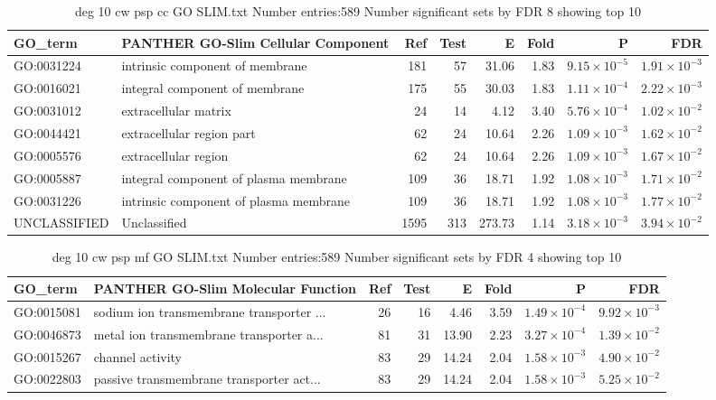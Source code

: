 \begin{table}[ht]
\centering
\begin{tabular}{llrrrrrr}
  \hline
GO\_term & PANTHER GO-Slim Cellular Component & Ref & Test & E & Fold & P & FDR \\ 
  \hline
GO:0031224 & intrinsic component of membrane  & 181 & 57 & 31.06 & 1.83 & $9.15 \times 10^{-5}$ & $1.91 \times 10^{-3}$ \\ 
  GO:0016021 & integral component of membrane  & 175 & 55 & 30.03 & 1.83 & $1.11 \times 10^{-4}$ & $2.22 \times 10^{-3}$ \\ 
  GO:0031012 & extracellular matrix  & 24 & 14 & 4.12 & 3.40 & $5.76 \times 10^{-4}$ & $1.02 \times 10^{-2}$ \\ 
  GO:0044421 & extracellular region part  & 62 & 24 & 10.64 & 2.26 & $1.09 \times 10^{-3}$ & $1.62 \times 10^{-2}$ \\ 
  GO:0005576 & extracellular region  & 62 & 24 & 10.64 & 2.26 & $1.09 \times 10^{-3}$ & $1.67 \times 10^{-2}$ \\ 
  GO:0005887 & integral component of plasma membrane  & 109 & 36 & 18.71 & 1.92 & $1.08 \times 10^{-3}$ & $1.71 \times 10^{-2}$ \\ 
  GO:0031226 & intrinsic component of plasma membrane  & 109 & 36 & 18.71 & 1.92 & $1.08 \times 10^{-3}$ & $1.77 \times 10^{-2}$ \\ 
  UNCLASSIFIED & Unclassified  & 1595 & 313 & 273.73 & 1.14 & $3.18 \times 10^{-3}$ & $3.94 \times 10^{-2}$ \\ 
  \hline
\end{tabular}
\caption{deg 10 cw psp cc GO SLIM.txt Number entries:589 Number significant sets by FDR 8 showing top 10} 
\label{tab:deg 10 cw psp cc GO SLIM.txt Number entries:589 Number significant sets by FDR 8 showing top 10}
\end{table}
\begin{table}[ht]
\centering
\begin{tabular}{llrrrrrr}
  \hline
GO\_term & PANTHER GO-Slim Molecular Function & Ref & Test & E & Fold & P & FDR \\ 
  \hline
GO:0015081 & sodium ion transmembrane transporter ... & 26 & 16 & 4.46 & 3.59 & $1.49 \times 10^{-4}$ & $9.92 \times 10^{-3}$ \\ 
  GO:0046873 & metal ion transmembrane transporter a... & 81 & 31 & 13.90 & 2.23 & $3.27 \times 10^{-4}$ & $1.39 \times 10^{-2}$ \\ 
  GO:0015267 & channel activity  & 83 & 29 & 14.24 & 2.04 & $1.58 \times 10^{-3}$ & $4.90 \times 10^{-2}$ \\ 
  GO:0022803 & passive transmembrane transporter act... & 83 & 29 & 14.24 & 2.04 & $1.58 \times 10^{-3}$ & $5.25 \times 10^{-2}$ \\ 
  \hline
\end{tabular}
\caption{deg 10 cw psp mf GO SLIM.txt Number entries:589 Number significant sets by FDR 4 showing top 10} 
\label{tab:deg 10 cw psp mf GO SLIM.txt Number entries:589 Number significant sets by FDR 4 showing top 10}
\end{table}
 
